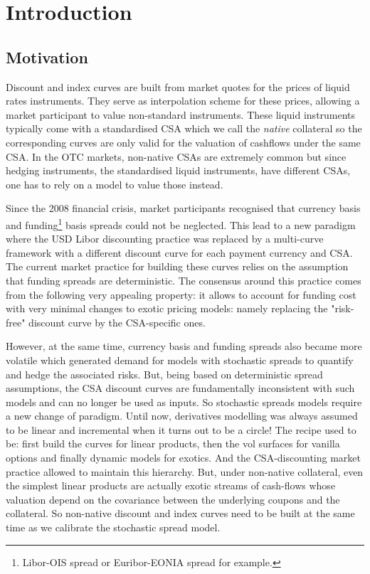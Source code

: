 \documentclass[11pt,english]{amsart}
\theoremstyle{definition}
\begin{document}
\tableofcontents




\newpage%
\setcounter{section}{-1}
\section{Introduction}%

\subsection{Motivation}
Discount and index curves are built from market quotes for the prices of liquid rates instruments. They serve as interpolation scheme for these prices, allowing a market participant to value non-standard instruments. 
These liquid instruments typically come with a standardised CSA which we call the \emph{native} collateral so the corresponding curves are only valid for the valuation of cashflows under the same CSA. 
In the OTC markets, non-native CSAs are extremely common but since hedging instruments, the standardised liquid instruments, have different CSAs, one has to rely on a model to value those instead. 

Since the 2008 financial crisis, market participants recognised that currency basis and funding\footnote{Libor-OIS spread or Euribor-EONIA spread for example.} basis spreads could not be neglected. This lead to a new paradigm where the USD Libor discounting practice was replaced by a multi-curve framework with a different discount curve for each payment currency and CSA. The current market practice for building these curves relies on the assumption that funding spreads are deterministic. The consensus around this practice comes from the following very appealing property: it allows to account for funding cost with very minimal changes to exotic pricing models: namely replacing the "risk-free" discount curve by the CSA-specific ones.

However, at the same time, currency basis and funding spreads also became more volatile which generated demand for models with stochastic spreads to quantify and hedge the associated risks. But, being based on deterministic spread assumptions, the CSA discount curves are fundamentally inconsistent with such models and can no longer be used as inputs. So stochastic spreads models require a new change of paradigm. Until now, derivatives modelling was always assumed to be linear and incremental when it turns out to be a circle! The recipe used to be: first build the curves for linear products, then the vol surfaces for vanilla options and finally dynamic models for exotics. And the CSA-discounting market practice allowed to maintain this hierarchy. But, under non-native collateral, even the simplest linear products are actually exotic streams of cash-flows whose valuation depend on the covariance between the underlying coupons and the collateral. So non-native discount and index curves need to be built at the same time as we calibrate the stochastic spread model. 
\end{document}

